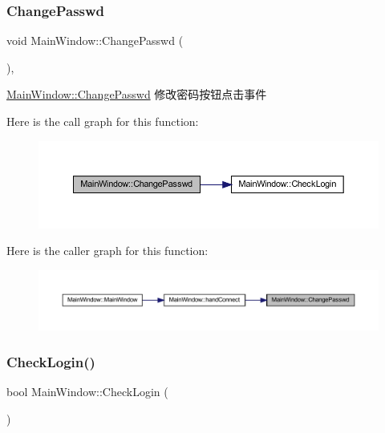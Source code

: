 \subsubsection{\texorpdfstring{ChangePasswd}{ChangePasswd}}
{\footnotesize\ttfamily void Main\+Window\+::\+Change\+Passwd (\begin{DoxyParamCaption}{ }\end{DoxyParamCaption})\hspace{0.3cm}{\ttfamily [private]}, {\ttfamily [slot]}}



\mbox{\hyperlink{class_main_window_a86aa997699ba4fdf4d7b258a412315e5}{Main\+Window\+::\+Change\+Passwd}} 修改密码按钮点击事件 

Here is the call graph for this function\+:
\nopagebreak
\begin{figure}[H]
\begin{center}
\leavevmode
\includegraphics[width=350pt]{class_main_window_a86aa997699ba4fdf4d7b258a412315e5_cgraph}
\end{center}
\end{figure}
Here is the caller graph for this function\+:
\nopagebreak
\begin{figure}[H]
\begin{center}
\leavevmode
\includegraphics[width=350pt]{class_main_window_a86aa997699ba4fdf4d7b258a412315e5_icgraph}
\end{center}
\end{figure}
\mbox{\label{class_main_window_add9eeb672a0e00eb427170f1367b2281}} 
\subsubsection{\texorpdfstring{CheckLogin()}{CheckLogin()}}
{\footnotesize\ttfamily bool Main\+Window\+::\+Check\+Login (\begin{DoxyParamCaption}{ }\end{DoxyParamCaption})\hspace{0.3cm}{\ttfamily [protected]}}



